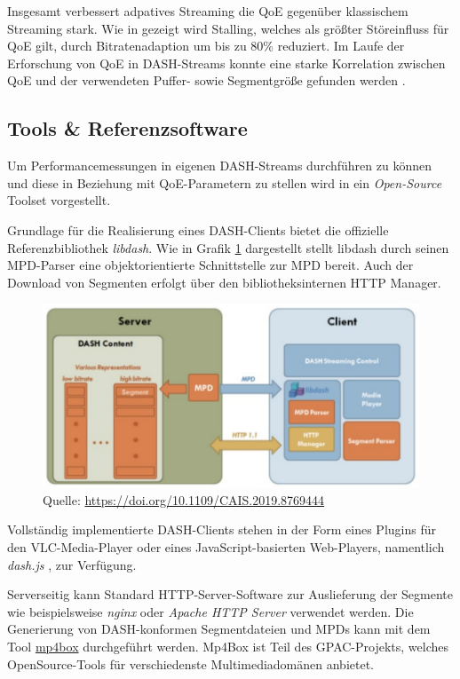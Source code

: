 \documentclass[paper = a4, fontsize = 12pt, parskip = half]{scrartcl} %
\begin{document}
Insgesamt verbessert adpatives Streaming die QoE gegenüber klassischem Streaming stark. Wie in \cite{yao_empirical_2011} gezeigt wird Stalling, welches als größter Störeinfluss für QoE gilt, durch Bitratenadaption um bis zu 80\% reduziert. Im Laufe der Erforschung von QoE in DASH-Streams konnte eine starke Korrelation zwischen QoE und der verwendeten Puffer- sowie Segmentgröße gefunden werden \cite{seufert_survey_2015}.

\subsection{Tools \& Referenzsoftware}
Um Performancemessungen in eigenen DASH-Streams durchführen zu können und diese in Beziehung mit QoE-Parametern zu stellen wird in \cite{lederer_open_2012-1} ein \textit{Open-Source} Toolset vorgestellt. 

Grundlage für die Realisierung eines DASH-Clients bietet die offizielle Referenzbibliothek \textit{libdash}. Wie in Grafik \ref{libdash_embedded} dargestellt stellt libdash durch seinen MPD-Parser eine objektorientierte Schnittstelle zur MPD bereit. Auch der Download von Segmenten erfolgt über den bibliotheksinternen HTTP Manager.

\begin{center}
	\begin{figure}[ht]
		\centering
		\includegraphics[width=12cm]{images/libdash_embedded.png}
		\caption{Quelle: \url{https://doi.org/10.1109/CAIS.2019.8769444}}
		\label{libdash_embedded}
	\end{figure}
\end{center}

Vollständig implementierte DASH-Clients stehen in der Form eines Plugins für den VLC-Media-Player \cite{muller_vlc_2011} oder eines JavaScript-basierten Web-Players, namentlich \textit{dash.js} \cite{rainer_seamless_2012-1}, zur Verfügung.

Serverseitig kann Standard HTTP-Server-Software zur Auslieferung der Segmente wie beispielsweise \textit{nginx} oder \textit{Apache HTTP Server} verwendet werden. Die Generierung von DASH-konformen Segmentdateien und MPDs kann mit dem Tool \hyperref{https://github.com/gpac/gpac}{}{}{mp4box} durchgeführt werden. Mp4Box ist Teil des GPAC-Projekts, welches OpenSource-Tools für verschiedenste Multimediadomänen anbietet.
\end{document}
